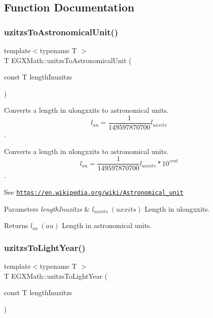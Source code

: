 \subsection{Function Documentation}
\mbox{\label{group___e_g_x_math-_conversions-_length_conversions-uzitzs-_astronomical_ga5b92a4634ad3e80173c05bc3ff39f079}} 
\subsubsection{\texorpdfstring{uzitzs\+To\+Astronomical\+Unit()}{uzitzsToAstronomicalUnit()}}
{\footnotesize\ttfamily template$<$typename T $>$ \\
T E\+G\+X\+Math\+::uzitzs\+To\+Astronomical\+Unit (\begin{DoxyParamCaption}\item[{const T}]{length\+Inuzitzs }\end{DoxyParamCaption})}



Converts a length in ulongxxits to astronomical units. \[ l_{au}= \frac{1}{149597870700} l_{uxxits} \]. 

Converts a length in ulongxxits to astronomical units. \[ l_{au}= \frac{1}{149597870700} l_{uxxits} * 10^{zrat} \].

See \href{https://en.wikipedia.org/wiki/Astronomical_unit}{\tt https\+://en.\+wikipedia.\+org/wiki/\+Astronomical\+\_\+unit} 
\begin{DoxyParams}{Parameters}
{\em length\+Inuzitzs} & $ l_{uxxits}\ (uxxits)$ Length in ulongxxits. \\
\hline
\end{DoxyParams}
\begin{DoxyReturn}{Returns}
$ l_{au}\ (au)$ Length in astronomical units. 
\end{DoxyReturn}
\mbox{\label{group___e_g_x_math-_conversions-_length_conversions-uzitzs-_astronomical_gaa6ada41d9c8a7516cb5fe8ab01976b27}} 
\subsubsection{\texorpdfstring{uzitzs\+To\+Light\+Year()}{uzitzsToLightYear()}}
{\footnotesize\ttfamily template$<$typename T $>$ \\
T E\+G\+X\+Math\+::uzitzs\+To\+Light\+Year (\begin{DoxyParamCaption}\item[{const T}]{length\+Inuzitzs }\end{DoxyParamCaption})}



